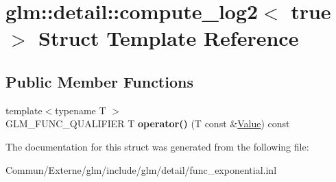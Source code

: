 \hypertarget{structglm_1_1detail_1_1compute__log2_3_01true_01_4}{}\section{glm\+:\+:detail\+:\+:compute\+\_\+log2$<$ true $>$ Struct Template Reference}
\label{structglm_1_1detail_1_1compute__log2_3_01true_01_4}
\subsection*{Public Member Functions}
\begin{DoxyCompactItemize}
\item 
{\footnotesize template$<$typename T $>$ }\\G\+L\+M\+\_\+\+F\+U\+N\+C\+\_\+\+Q\+U\+A\+L\+I\+F\+I\+ER T {\bfseries operator()} (T const \&\hyperlink{document_8h_a071cf97155ba72ac9a1fc4ad7e63d481}{Value}) const \hypertarget{structglm_1_1detail_1_1compute__log2_3_01true_01_4_a4b8abe824c3c88324a640b5d88cbce99}{}\label{structglm_1_1detail_1_1compute__log2_3_01true_01_4_a4b8abe824c3c88324a640b5d88cbce99}

\end{DoxyCompactItemize}


The documentation for this struct was generated from the following file\+:\begin{DoxyCompactItemize}
\item 
Commun/\+Externe/glm/include/glm/detail/func\+\_\+exponential.\+inl\end{DoxyCompactItemize}
